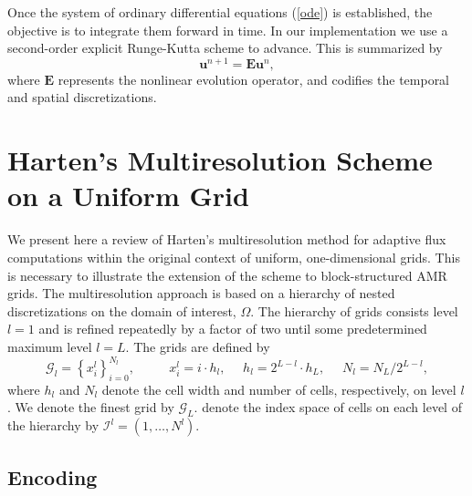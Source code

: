 \documentclass[12pt,letterpaper]{article}
\begin{document}
        Once the system of ordinary differential equations (\ref{ode}) is
        established, the objective is to integrate them forward in time. In our
        implementation we use a second-order explicit Runge-Kutta scheme to
        advance. This is summarized by
        \begin{equation}
            \bm{u}^{n+1} = \bm{E} \bm{u}^{n},
        \end{equation}
        where $\bm{E}$ represents the nonlinear evolution operator, and codifies the
        temporal and spatial discretizations.

\section{Harten's Multiresolution Scheme on a Uniform Grid}

    We present here a review of Harten's multiresolution method for adaptive
    flux computations within the original context of uniform, one-dimensional
    grids. This is necessary to illustrate the extension of the scheme to
    block-structured AMR grids. The multiresolution approach is based on a
    hierarchy of nested discretizations on the domain of interest, $\Omega$.
    The hierarchy of grids consists level $l=1$ and is
    refined repeatedly by a factor of two until some
    predetermined maximum level $l=L$.  The grids are defined by
    \begin{equation}
        \bm{\mathcal{G}}_{l} = \left\{ x_{i}^{l} \right\}_{i=0}^{N_{l}}, \text{ }
        \text{ } \text{ } \text{ } x_{i}^{l} = i \cdot h_{l}, \text{ }
        \text{ } h_{l} = 2^{L-l} \cdot h_{L}, \text{ } \text{ } N_{l} = N_{L}
        / 2^{L-l},
    \end{equation}
    where $h_{l}$ and $N_{l}$ denote the cell width and number of cells,
    respectively, on level $l$. We denote the finest grid by
    $\bm{\mathcal{G}}_{L}$. denote the index space of cells on each level
    of the hierarchy by $\bm{\mathcal{I}}^{l} = (1,\dots,N^{l})$.

    \subsection*{Encoding}
\end{document}
